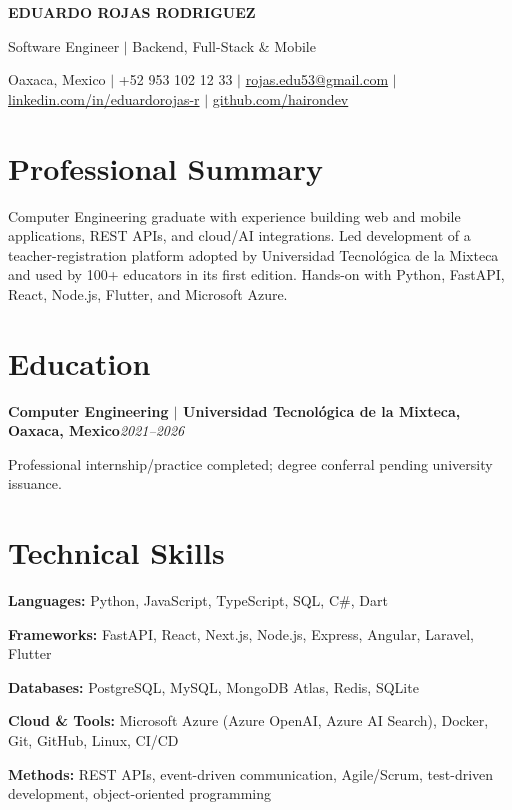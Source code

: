 \documentclass[10pt,letterpaper]{article}
\newcommand{\job}[2]{\textbf{#1}\hfill\textit{#2}\par\vspace{-1pt}}
\begin{document}
\fontsize{9.6}{11.1}\selectfont

\begin{center}
  {\fontsize{20}{22}\selectfont\bfseries EDUARDO ROJAS RODRIGUEZ}\par
  \vspace{1pt}
  {\fontsize{10}{11}\selectfont Software Engineer $|$ Backend, Full-Stack \& Mobile}\par
  \vspace{3pt}
  Oaxaca, Mexico $|$ +52 953 102 12 33 $|$
  \href{mailto:rojas.edu53@gmail.com}{rojas.edu53@gmail.com} $|$
  \href{https://linkedin.com/in/eduardorojas-r}{linkedin.com/in/eduardorojas-r} $|$
  \href{https://github.com/hairondev}{github.com/hairondev}
\end{center}
\vspace{-5pt}

\section*{Professional Summary}
Computer Engineering graduate with experience building web and mobile applications, REST APIs, and cloud/AI integrations. Led development of a teacher-registration platform adopted by Universidad Tecnológica de la Mixteca and used by 100+ educators in its first edition. Hands-on with Python, FastAPI, React, Node.js, Flutter, and Microsoft Azure.

\section*{Education}
\job{Computer Engineering $|$ Universidad Tecnológica de la Mixteca, Oaxaca, Mexico}{2021--2026}
Professional internship/practice completed; degree conferral pending university issuance.

\section*{Technical Skills}
\textbf{Languages:} Python, JavaScript, TypeScript, SQL, C\#, Dart\par
\textbf{Frameworks:} FastAPI, React, Next.js, Node.js, Express, Angular, Laravel, Flutter\par
\textbf{Databases:} PostgreSQL, MySQL, MongoDB Atlas, Redis, SQLite\par
\textbf{Cloud \& Tools:} Microsoft Azure (Azure OpenAI, Azure AI Search), Docker, Git, GitHub, Linux, CI/CD\par
\textbf{Methods:} REST APIs, event-driven communication, Agile/Scrum, test-driven development, object-oriented programming
\end{document}
